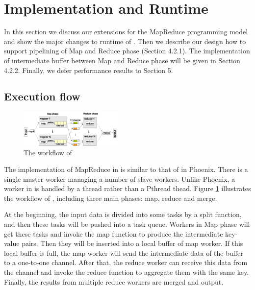 \section{Implementation and Runtime}
\label{sec:runtime}
In this section we discuss our extensions for the MapReduce programming model and show the major changes to runtime of \myds. 
Then we describe our design how to support pipelining of Map and Reduce phase (Section 4.2.1).
The implementation of intermediate buffer between Map and Reduce phase will be given in Section 4.2.2.
Finally, we defer performance results to Section 5.



\subsection{Execution flow}
\begin{figure}[!h!t]  
    \centering
    \includegraphics[width=0.45\textwidth]{eps/dmr_workflow.eps}
    \caption{The workflow of \myds}
    \label{fig:dmr:workflow}
\end{figure}

The implementation of MapReduce in \myds is similar to that of in Phoenix. 
There is a single master worker managing a number of slave workers. Unlike Phoenix,  a worker in \myds is handled by a \myth thread rather than a Pthread thead.
Figure \ref{fig:dmr:workflow} illustrates the workflow of \myds, including three main phases: map, reduce and merge. 

At the beginning, the input data is divided into some tasks by a split function, and then these tasks will be pushed  into a task queue. 
Workers in Map phase will get these tasks and invoke the map function to produce the intermediate key-value pairs.
Then they will be inserted into a local buffer of map worker.
If this local buffer is full, the map worker will send the intermediate data of the buffer to a one-to-one channel.
After that, the reduce worker can receive this data from the channel and invoke the reduce function to aggregate them with the same key.  
Finally, the results from multiple reduce workers are merged and output.

